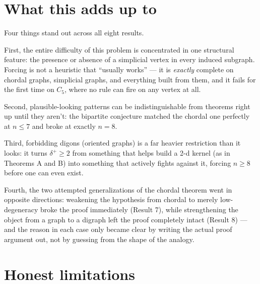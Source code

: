\documentclass[11pt]{article}
\theoremstyle{plain}
\theoremstyle{definition}
\theoremstyle{remark}
\begin{document}
\section{What this adds up to}

Four things stand out across all eight results.

First, the entire difficulty of this problem is concentrated in one structural
feature: the presence or absence of a simplicial vertex in every induced subgraph.
Forcing is not a heuristic that ``usually works'' — it is \emph{exactly} complete on
chordal graphs, simplicial graphs, and everything built from them, and it fails for
the first time on $C_5$, where no rule can fire on any vertex at all.

Second, plausible-looking patterns can be indistinguishable from theorems right up
until they aren't: the bipartite conjecture matched the chordal one perfectly at
$n \le 7$ and broke at exactly $n = 8$.

Third, forbidding digons (oriented graphs) is a far heavier restriction than it looks:
it turns $\delta^+ \ge 2$ from something that helps build a 2-d kernel (as in Theorems A
and B) into something that actively fights against it, forcing $n \ge 8$ before one can
even exist.

Fourth, the two attempted generalizations of the chordal theorem went in opposite
directions: weakening the hypothesis from chordal to merely low-degeneracy broke the
proof immediately (Result 7), while strengthening the object from a graph to a
digraph left the proof completely intact (Result 8) — and the reason in each case only
became clear by writing the actual proof argument out, not by guessing from the shape
of the analogy.

\section{Honest limitations}
\end{document}
